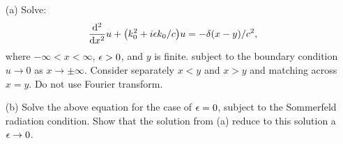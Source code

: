 \documentclass[12pt]{report}
\begin{document}
\newpage



\begin{problem}
    \begin{enumerate}
        \item [(a)]
        Solve:
        \[
            \frac{\mathrm{d}^{2} }{\mathrm{d} x^{2}}u + {\left(k_0^2 + i{\epsilon} k_0 / c\right)}u = -\delta(x -y)/c^2,
        \]
        where $-\infty < x < \infty$, ${\epsilon} > 0$, and $y$ is finite. subject to the boundary condition $u\to 0$ as $x \to \pm \infty$. Consider separately $x<y$ and $x>y$ and matching across $x=y$. Do not use Fourier transform.
        
        
        
        \item [(b)]
        Solve the above equation for the case of ${\epsilon} = 0$, subject to the Sommerfeld radiation condition. Show that the solution from (a) reduce to this solution a ${\epsilon} \to 0$.
        
        
    \end{enumerate}
    


\end{problem}
\end{document}
